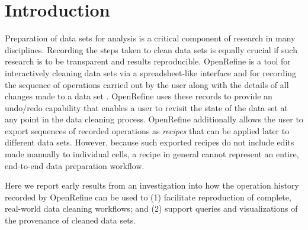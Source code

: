 \section{Introduction}

Preparation of data sets for analysis is a critical component of research in many disciplines. Recording the steps taken to clean data sets is equally crucial if such research is to be transparent and results reproducible. OpenRefine is a tool for interactively cleaning data sets via a spreadsheet-like interface and for recording the sequence of operations carried out by the user along with the details of all changes made to a data set \cite{verborgh_using_2013}. OpenRefine uses these records to provide an undo/redo capability that enables a user to revisit the state of the data set at any point in the data cleaning process. OpenRefine additionally allows the user to export sequences of recorded operations as \emph{recipes} that can be applied later to different data sets. However, because such exported recipes do not include edits made manually to individual cells, a recipe in general cannot represent an entire, end-to-end data preparation workflow. 

Here we report early results from an investigation into how the operation history recorded by OpenRefine can be used to (1) facilitate reproduction of complete, real-world data cleaning workflows; and (2) support queries and visualizations of the provenance of cleaned data sets.
